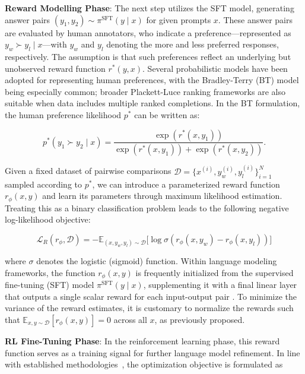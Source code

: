 \textbf{Reward Modelling Phase}: The next step utilizes the SFT model, generating answer pairs $(y_1, y_2) \sim \pi^\text{SFT}(y \mid x)$ for given prompts $x$. These answer pairs are evaluated by human annotators, who indicate a preference—represented as $y_w \succ y_l \mid x$—with $y_w$ and $y_l$ denoting the more and less preferred responses, respectively. The assumption is that such preferences reflect an underlying but unobserved reward function $r^*(y, x)$. Several probabilistic models have been adopted for representing human preferences, with the Bradley-Terry (BT) model \cite{bradley1952rankanalysis} being especially common; broader Plackett-Luce ranking frameworks \citep{plackett1975analysis, luce2012individual} are also suitable when data includes multiple ranked completions. In the BT formulation, the human preference likelihood $p^*$ can be written as:

\begin{equation}\label{eq:bradley-terry}
    p^*(y_1\succ y_2 \mid x)=\frac{\exp\left(r^*(x, y_1)\right)}{\exp\left(r^*(x, y_1)\right) + \exp\left(r^*(x, y_2)\right)}.
\end{equation}

Given a fixed dataset of pairwise comparisons $\mathcal{D} = \bigl\{x^{(i)}, y_w^{(i)}, y_l^{(i)}\bigr\}_{i=1}^N$ sampled according to $p^*$, we can introduce a parameterized reward function $r_{\phi}(x, y)$ and learn its parameters through maximum likelihood estimation. Treating this as a binary classification problem leads to the following negative log-likelihood objective:

\begin{equation}\label{eq:reward_model}
    \mathcal{L}_R(r_{\phi}, \mathcal{D}) = -\mathbb{E}_{(x, y_w, y_l)\sim \mathcal{D}}\bigl[\log \sigma(r_{\phi}(x, y_w)- r_{\phi}(x, y_l))\bigr]
\end{equation}

where $\sigma$ denotes the logistic (sigmoid) function. Within language modeling frameworks, the function $r_{\phi}(x, y)$ is frequently initialized from the supervised fine-tuning (SFT) model $\pi^\text{SFT}(y \mid x)$, supplementing it with a final linear layer that outputs a single scalar reward for each input-output pair \cite{ziegler2020finetuning}. To minimize the variance of the reward estimates, it is customary to normalize the rewards such that $\mathbb{E}_{x,y\sim \mathcal{D}}\left[r_\phi(x, y)\right] = 0$ across all $x$, as previously proposed.

\textbf{RL Fine-Tuning Phase}: In the reinforcement learning phase, this reward function serves as a training signal for further language model refinement. In line with established methodologies~\citep{jaques2017sequence, jaques2020human}, the optimization objective is formulated as

